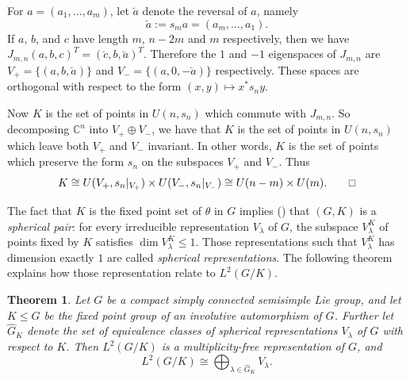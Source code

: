 \documentclass[12pt]{article}
\numberwithin{equation}{section}
\theoremstyle{plainsl}
\newtheorem{theorem}{Theorem}[section]
\renewenvironment{proof}{\noindent{{\sl Proof. }}}{\medbreak}
\def\sqr#1#2{{\vbox{\hrule height.#2pt
    \hbox{\vrule width.#2pt height#1pt \kern#1pt
        \vrule width.#2pt}\hrule height.#2pt}}}
\def\eqed{\tag*{\sqr53}}
\newcommand\defn[1]{\textsl{#1}}
\newcommand\la{\lambda}
\renewcommand\th{\theta} %
\newcommand\cx{{\mathbb C}}%
\begin{document}
\begin{proof}
For $a = (a_1,\ldots,a_m)$, let $\breve{a}$ denote the reversal of $a$, namely
\[
\breve{a} := s_ma = (a_m,\ldots,a_1).
\]
If $a$, $b$, and $c$ have length $m$, $n-2m$ and $m$ respectively, then we have $J_{m,n}(a,b,c)^T = (\breve{c},b,\breve{a})^T$. Therefore the $1$ and $-1$ eigenspaces of $J_{m,n}$ are $V_+ = \{(a,b,\breve{a})\}$ and $V_- = \{(a,0,-\breve{a})\}$ respectively. These spaces are orthogonal with respect to the form $(x,y) \mapsto x^*s_ny$. 

Now $K$ is the set of points in $U(n,s_n)$ which commute with $J_{m,n}$. So decomposing $\cx^n$ into $V_+ \oplus V_-$, we have that $K$ is the set of points in $U(n,s_n)$ which leave both $V_+$ and $V_-$ invariant. In other words, $K$ is the set of points which preserve the form $s_n$ on the subspaces $V_+$ and $V_-$. Thus 
\[
K \cong U(V_+,s_n|_{V_+}) \times U(V_-,s_n|_{V_-}) \cong U(n-m) \times U(m). \eqed
\]
\end{proof}

The fact that $K$ is the fixed point set of $\th$ in $G$ implies (\cite[Theorem 12.3.5]{gw1}) that $(G,K)$ is a \defn{spherical pair}: for every irreducible representation $V_\la$ of $G$, the subspace $V_\la^K$ of points fixed by $K$ satisfies $\dim V_\la^K \leq 1$. Those representations such that $V_\la^K$ has dimension exactly $1$ are called \defn{spherical representations}. The following theorem \cite[Theorem V.4.3]{hel} explains how those representation relate to $L^2(G/K)$.

\begin{theorem}
Let $G$ be a compact simply connected semisimple Lie group, and let $K \leq G$ be the fixed point group of an involutive automorphism of $G$. Further let $\hat{G}_K$ denote the set of equivalence classes of spherical representations $V_\la$ of $G$ with respect to $K$. Then $L^2(G/K)$ is a multiplicity-free representation of $G$, and
\[
L^2(G/K) \cong \bigoplus_{\la \in \hat{G}_K} V_\la.
\]
\end{theorem}
\end{document}
